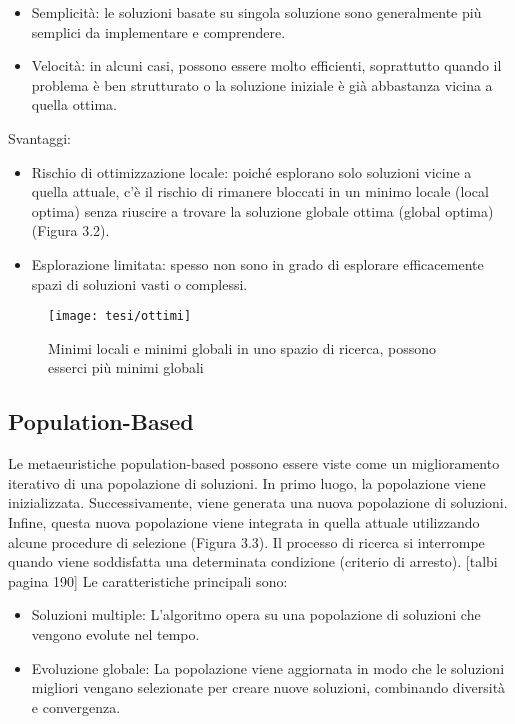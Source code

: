 \begin{itemize}
    \item Semplicità: le soluzioni basate su singola soluzione sono generalmente più semplici da implementare e comprendere.
    \item Velocità: in alcuni casi, possono essere molto efficienti, soprattutto quando il problema è ben strutturato o la soluzione iniziale è già abbastanza vicina a quella ottima.
\end{itemize}
Svantaggi:
\begin{itemize}
    \item Rischio di ottimizzazione locale: poiché esplorano solo soluzioni vicine a quella attuale, c'è il rischio di rimanere bloccati in un minimo locale (local optima) senza riuscire a trovare la soluzione globale ottima (global optima) (Figura 3.2).
    \item Esplorazione limitata: spesso non sono in grado di esplorare efficacemente spazi di soluzioni vasti o complessi.
\end{itemize}

\begin{figure}[h!] 
    \centering 
    \texttt{[image: tesi/ottimi]} 
    \caption{Minimi locali e minimi globali in uno spazio di ricerca, possono esserci più minimi globali}
\end{figure}

\subsection{Population-Based}

Le metaeuristiche population-based possono essere viste come un miglioramento iterativo di una popolazione di soluzioni. In primo luogo, la popolazione viene inizializzata. Successivamente, viene generata una nuova popolazione di soluzioni. Infine, questa nuova popolazione viene integrata in quella attuale utilizzando alcune procedure di selezione (Figura 3.3). Il processo di ricerca si interrompe quando viene soddisfatta una determinata condizione (criterio di arresto). [talbi pagina 190] Le caratteristiche principali sono:
\begin{itemize}
    \item Soluzioni multiple: L'algoritmo opera su una popolazione di soluzioni che vengono evolute nel tempo.
    \item Evoluzione globale: La popolazione viene aggiornata in modo che le soluzioni migliori vengano selezionate per creare nuove soluzioni, combinando diversità e convergenza.
\end{itemize}

